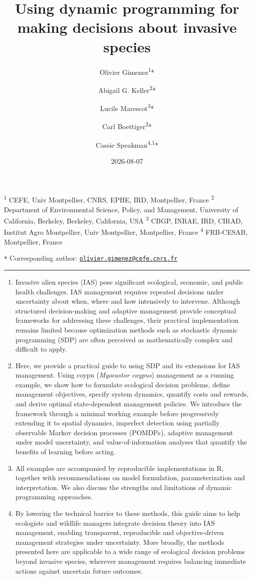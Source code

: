 \documentclass[
  11pt,
  a4paper,
]{article}
\title{Using dynamic programming for making decisions about invasive species}
\author{Olivier Gimenez\textsuperscript{1}* \and Abigail G. Keller\textsuperscript{2}* \and Lucile Marescot\textsuperscript{3}* \and Carl Boettiger\textsuperscript{2}* \and Cassie Speakman\textsuperscript{4,1}*}
\date{2026-08-07}
\begin{document}
\maketitle

\linenumbers

\small

\textsuperscript{1} CEFE, Univ Montpellier, CNRS, EPHE, IRD, Montpellier, France
\textsuperscript{2} Department of Environmental Science, Policy, and Management, University of California, Berkeley, Berkeley, California, USA
\textsuperscript{3} CBGP, INRAE, IRD, CIRAD, Institut Agro Montpellier, Univ Montpellier, Montpellier, France
\textsuperscript{4} FRB-CESAB, Montpellier, France

\texttt{*} Corresponding author: \href{mailto:olivier.gimenez@cefe.cnrs.fr}{\nolinkurl{olivier.gimenez@cefe.cnrs.fr}}

\normalsize

\vspace{1cm}
\hrule

\begin{enumerate}
\def\labelenumi{\arabic{enumi}.}
\item
  Invasive alien species (IAS) pose significant ecological, economic, and public health challenges. IAS management requires repeated decisions under uncertainty about when, where and how intensively to intervene. Although structured decision-making and adaptive management provide conceptual frameworks for addressing these challenges, their practical implementation remains limited because optimization methods such as stochastic dynamic programming (SDP) are often perceived as mathematically complex and difficult to apply.
\item
  Here, we provide a practical guide to using SDP and its extensions for IAS management. Using coypu (\emph{Myocastor coypus}) management as a running example, we show how to formulate ecological decision problems, define management objectives, specify system dynamics, quantify costs and rewards, and derive optimal state-dependent management policies. We introduce the framework through a minimal working example before progressively extending it to spatial dynamics, imperfect detection using partially observable Markov decision processes (POMDPs), adaptive management under model uncertainty, and value-of-information analyses that quantify the benefits of learning before acting.
\item
  All examples are accompanied by reproducible implementations in R, together with recommendations on model formulation, parameterization and interpretation. We also discuss the strengths and limitations of dynamic programming approaches.
\item
  By lowering the technical barrier to these methods, this guide aims to help ecologists and wildlife managers integrate decision theory into IAS management, enabling transparent, reproducible and objective-driven management strategies under uncertainty. More broadly, the methods presented here are applicable to a wide range of ecological decision problems beyond invasive species, wherever management requires balancing immediate actions against uncertain future outcomes.
\end{enumerate}
\end{document}
